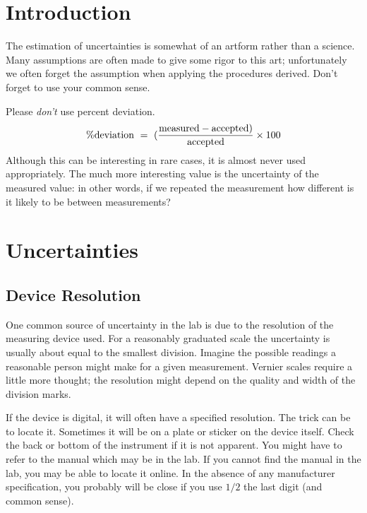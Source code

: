 \section{Introduction}

The estimation of uncertainties is somewhat of an artform rather than a science. 
Many assumptions are often made to give some rigor to this art; unfortunately we
often forget the assumption when applying the procedures derived.  Don't forget
to use your common sense.

Please {\em don't} use percent deviation.  
\begin{equation}
\% {\rm deviation} ~=~ ({{ \rm measured} - {\rm accepted }) \over {\rm accepted }} \times 100
\end{equation}
Although this can be interesting in rare cases, it is almost never used
appropriately.  The much more interesting value is the uncertainty of the
measured value: in other words, if we repeated the measurement how different is
it likely to be between measurements? 

\section{Uncertainties}

\subsection{Device Resolution}

One common source of uncertainty in the lab is due to the resolution of the
measuring device used.
For a reasonably graduated scale the uncertainty is usually about equal to the
smallest division.  Imagine the possible readings a reasonable person might make
for a given measurement.  Vernier scales require a little more thought; the
resolution might depend on the quality and width of the division marks.

If the device is digital, it will often have a specified resolution.  The trick
can be to locate it.  Sometimes it will be on a plate or sticker on the device
itself.  Check the back or bottom of the instrument if it is not apparent.  You
might have to refer to the manual which may be in the lab.  If you cannot find
the manual in the lab, you may be able to locate it online.  In the absence of
any manufacturer specification, you probably will be close if you use $1/2$ the
last digit (and common sense).

